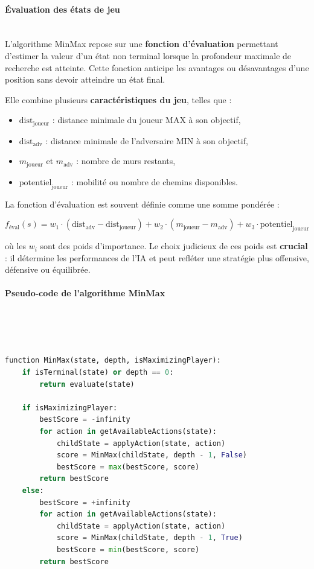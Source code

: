 \paragraph{Évaluation des états de jeu} \\

L’algorithme MinMax repose sur une \textbf{fonction d’évaluation} permettant d’estimer la valeur d’un état non terminal lorsque la profondeur maximale de recherche est atteinte. Cette fonction anticipe les avantages ou désavantages d’une position sans devoir atteindre un état final.

Elle combine plusieurs \textbf{caractéristiques du jeu}, telles que :
\begin{itemize}
    \item $\text{dist}_{\text{joueur}}$ : distance minimale du joueur MAX à son objectif,
    \item $\text{dist}_{\text{adv}}$ : distance minimale de l’adversaire MIN à son objectif,
    \item $m_{\text{joueur}}$ et $m_{\text{adv}}$ : nombre de murs restants,
    \item $\text{potentiel}_{\text{joueur}}$ : mobilité ou nombre de chemins disponibles.
\end{itemize}

La fonction d’évaluation est souvent définie comme une somme pondérée :

\[
f_{\text{éval}}(s) = w_1 \cdot (\text{dist}_{\text{adv}} - \text{dist}_{\text{joueur}}) + w_2 \cdot (m_{\text{joueur}} - m_{\text{adv}}) + w_3 \cdot \text{potentiel}_{\text{joueur}}
\]

\noindent où les $w_i$ sont des poids d'importance. Le choix judicieux de ces poids est \textbf{crucial} : il détermine les performances de l’IA et peut refléter une stratégie plus offensive, défensive ou équilibrée.

\paragraph{Pseudo-code de l’algorithme MinMax} \\

\begin{lstlisting}[language=Python]


function MinMax(state, depth, isMaximizingPlayer):
    if isTerminal(state) or depth == 0:
        return evaluate(state)

    if isMaximizingPlayer:
        bestScore = -infinity
        for action in getAvailableActions(state):
            childState = applyAction(state, action)
            score = MinMax(childState, depth - 1, False)
            bestScore = max(bestScore, score)
        return bestScore
    else:
        bestScore = +infinity
        for action in getAvailableActions(state):
            childState = applyAction(state, action)
            score = MinMax(childState, depth - 1, True)
            bestScore = min(bestScore, score)
        return bestScore

\end{lstlisting}

